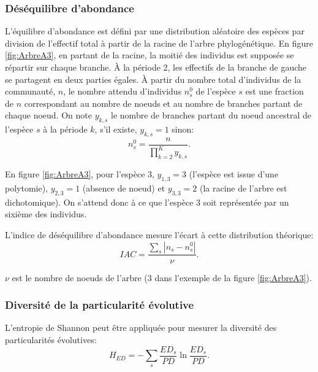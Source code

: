\documentclass[
  11pt,
  french,
  a4paper,
  extrafontsizes,onecolumn,openright
  ]{memoir}
\begin{document}
\subsubsection{Déséquilibre d'abondance}\label{duxe9suxe9quilibre-dabondance}

L'équilibre d'abondance est défini par une distribution aléatoire des espèces par division de l'effectif total à partir de la racine de l'arbre phylogénétique.
En figure \ref{fig:ArbreA3}, en partant de la racine, la moitié des individus est supposée se répartir sur chaque branche.
À la période 2, les effectifs de la branche de gauche se partagent en deux parties égales.
À partir du nombre total d'individus de la communauté, \(n\), le nombre attendu d'individus \(n_s^0\) de l'espèce \(s\) est une fraction de \(n\) correspondant au nombre de noeuds et au nombre de branches partant de chaque noeud.
On note \(y_{k,s}\) le nombre de branches partant du noeud ancestral de l'espèce \(s\) à la période \(k\), s'il existe, \(y_{k,s}=1\) sinon:
\begin{equation}
  n_s^0 = \frac{n}{\prod_{k=2}^{K}{y_{k,s}}}.
\end{equation}

En figure \ref{fig:ArbreA3}, pour l'espèce 3, \(y_{1,3}=3\) (l'espèce est issue d'une polytomie), \(y_{2,3}=1\) (absence de noeud) et \(y_{3,3}=2\) (la racine de l'arbre est dichotomique).
On s'attend donc à ce que l'espèce 3 soit représentée par un sixième des individus.

L'indice de déséquilibre d'abondance mesure l'écart à cette distribution théorique:
\begin{equation}
  \label{eq:IAC}
  \mathit{IAC} = \frac{\sum_s{|n_s - n_s^0|}}{\nu}.
\end{equation}

\(\nu\) est le nombre de noeuds de l'arbre (3 dans l'exemple de la figure \ref{fig:ArbreA3}).

\subsubsection{Diversité de la particularité évolutive}\label{diversituxe9-de-la-particularituxe9-uxe9volutive}

L'entropie de Shannon peut être appliquée pour mesurer la diversité des particularités évolutives:
\begin{equation}
  \label{eq:HED}
  H_{\mathit{ED}} = -\sum_s{\frac{\mathit{ED}_s}{\mathit{PD}} \ln\frac{\mathit{ED}_s}{\mathit{PD}}}.
\end{equation}
\end{document}
